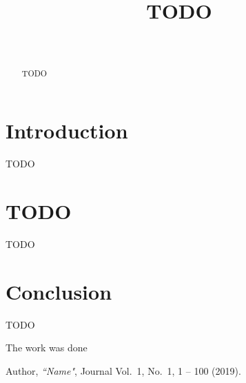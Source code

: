 \documentclass[
11pt,%
tightenlines,%
twoside,%
onecolumn,%
nofloats,%
nobibnotes,%
nofootinbib,%
superscriptaddress,%
noshowpacs,%
centertags]%
{revtex4}
\begin{document}

\title{TODO}

\author{~}
 




\begin{abstract}
TODO
\end{abstract}



\maketitle


\section{Introduction}

TODO

\section{TODO}

TODO

\section{Conclusion}

TODO

\begin{acknowledgments}
The work was done
\end{acknowledgments}

\begin{thebibliography}{99}

Author, {\it ``Name"}, Journal Vol.~1, No.~1, 1 -- 100 (2019).

\end{thebibliography}
\end{document}
